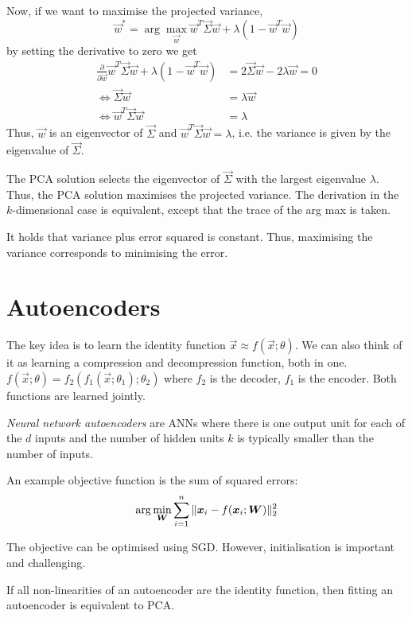 Now, if we want to maximise the projected variance,
\begin{equation*}
\vec{w}^* = \arg\max_{\vec{w}}{
	\vec{w}^T \vec{\Sigma} \vec{w} + \lambda (1 - \vec{w}^T \vec{w})
}
\end{equation*}
by setting the derivative to zero we get
\begin{align*}
\frac{\partial}{\partial \vec{w}}
\vec{w}^T \vec{\Sigma} \vec{w} + \lambda (1 - \vec{w}^T \vec{w}) &= 2 \vec{\Sigma} \vec{w} - 2 \lambda \vec{w} = 0 \\
\Leftrightarrow \vec{\Sigma} \vec{w}
&= \lambda \vec{w} \\
\Leftrightarrow \vec{w}^T \vec{\Sigma} \vec{w} &= \lambda
\end{align*}
Thus, $\vec{w}$ is an eigenvector of $\vec{\Sigma}$ and
$\vec{w}^T \vec{\Sigma} \vec{w} = \lambda$,
i.e. the variance is given by the eigenvalue of $\vec{\Sigma}$.

The PCA solution selects the eigenvector of $\vec{\Sigma}$
with the largest eigenvalue $\lambda$.
Thus, the PCA solution maximises the projected variance.
The derivation in the $k$-dimensional case is equivalent,
except that the trace of the arg max is taken.

It holds that
variance plus error squared is constant.
Thus, maximising the variance corresponds to minimising
the error.


\section{Autoencoders}
The key idea is to learn the identity function
$\vec{x} \approx f(\vec{x}; \theta)$.
We can also think of it as learning a
compression and decompression function, both in one.
$f(\vec{x};\theta) = f_2(f_1(\vec{x};\theta_1);\theta_2)$ where
$f_2$ is the decoder, $f_1$ is the encoder.
Both functions are learned jointly.

\emph{Neural network autoencoders} are ANNs where
there is one output unit for each of the $d$ inputs
and the number of hidden units $k$ is typically smaller
than the number of inputs.

An example objective function is the sum of squared errors:
\begin{equation*}
\arg\min_{\boldsymbol{W}}{
	\sum_{i=1}^n{
		\lVert\boldsymbol{x}_i - f(\boldsymbol{x}_i; \boldsymbol{W})\rVert_2^2
	}
}
\end{equation*}

The objective can be optimised using SGD.
However, initialisation is important and challenging.

If all non-linearities of an autoencoder
are the identity function,
then fitting an autoencoder is equivalent to PCA.
